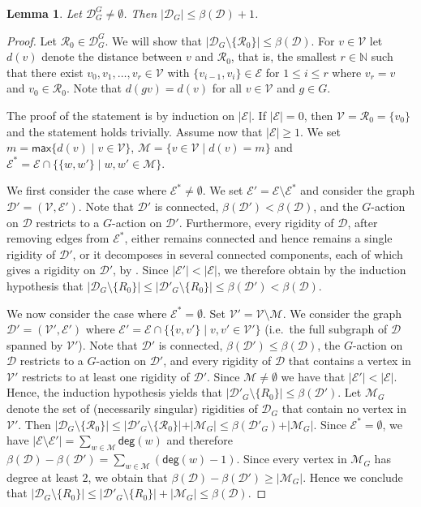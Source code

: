 \documentclass[a4paper,12pt,reqno]{amsart}
\newcommand\nat{\mathbb N}
\newcommand\mc\mathcal
\newtheorem{lem}[thm]{Lemma}
\theoremstyle{definition}
\numberwithin{equation}{thm}
\renewcommand{\max}{\mathsf{max}}
\renewcommand{\leq}{\leqslant}
\renewcommand{\geq}{\geqslant}
\renewcommand{\deg}{\mathsf{deg}}
\begin{document}
\begin{lem}\label{L:G-fixpoint-pivot-count}
Let $\mc{D}^G_G\neq \emptyset$.
Then $|\mc{D}_G | \leq \beta(\mc{D}) + 1$.  
\end{lem}

\begin{proof}
Let  $\mc{R}_0 \in \mc{D}^G_G$. We will show that  $|\mc{D}_G \setminus \{\mc{R}_0\} | \leq \beta(\mc{D})$.
For $v\in\mc{V}$ let $d(v)$ denote the distance between $v$ and $\mc{R}_0$, that is,
the smallest $r\in\nat$ such that there exist $v_0,v_1,\ldots,v_r\in\mc{V}$ with $\{v_{i-1},v_i\}\in\mc{E}$ for $1\leq i\leq r$ where $v_r=v$ and $v_0 \in \mc{R}_0$.
Note that $d(gv)=d(v)$ for all $v\in\mc{V}$ and $g\in G$.

The proof of the statement is  by induction 
 on $|\mc{E}|$.
If $|\mc{E}|=0$, then $\mc{V}= \mc{R}_0=\{v_0\}$ and the statement holds trivially.
Assume now that $|\mc{E}|\geq 1$. We set $m=\max\{d(v)\mid v\in\mc{V}\}$, $\mc{M}=\{v\in\mc{V}\mid d(v)=m\}$ and $\mc{E}^\ast=\mc{E}\cap\{\{w,w'\}\mid w,w'\in\mc{M}\}$.

We first consider the case where $\mc{E}^\ast\neq \emptyset$.
We set $\mc{E}'=\mc{E}\setminus\mc{E}^\ast$ and consider the graph $\mc{D}'=(\mc{V},\mc{E}')$.
Note that $\mc{D}'$ is connected, $\beta(\mc{D}') <\beta(\mc{D})$, and the $G$-action on $\mc{D}$ restricts to a $G$-action on $\mc{D}'$.
Furthermore, every rigidity of $\mc{D}$, after removing edges from $\mc{E}^\ast$, either remains connected and hence remains a single rigidity of $\mc{D}'$, or it decomposes in several connected components, each of which gives a rigidity on $\mc{D}'$, by .
Since $|\mc{E}'|<|\mc{E}|$, we therefore obtain by the induction hypothesis that 
$|\mc{D}_G\setminus\{R_0\}|\leq |\mc{D}'_G\setminus\{R_0\}|\leq \beta(\mc{D}')< \beta(\mc{D})$.

We now consider the case where $\mc{E}^\ast=\emptyset$. 
Set $\mc{V}'=\mc{V}\setminus \mc{M}$. We consider the graph $\mc{D}'=(\mc{V}',\mc{E}')$ where $\mc{E}'=\mc{E}\cap\{\{v,v'\}\mid v,v'\in\mc{V}'\}$ (i.e.~the full subgraph of $\mc{D}$ spanned by $\mc{V}'$).
Note that $\mc{D}'$ is connected,  $\beta(\mc{D}')\leq \beta(\mc{D})$, the $G$-action on $\mc{D}$ restricts to a $G$-action on $\mc{D}'$, and every rigidity of $\mc{D}$ that contains a vertex in $\mc{V}'$ restricts to at least one rigidity of $\mc{D}'$. 
Since $\mc{M}\neq \emptyset$ we have that $|\mc{E}'|<|\mc{E}|$.
Hence, the induction hypothesis yields that  $|\mc{D}'_G\setminus\{R_0\}|\leq \beta(\mc{D}')$. Let $\mc{M}_G$ denote the set of (necessarily singular) rigidities of $\mc{D}_G$ that contain no vertex in $\mc{V}'$.  Then 
$\vert \mc{D}_G\setminus\{\mc{R}_0\} \vert \leq \vert \mc{D}'_G\setminus\{\mc{R}_0\} \vert + \vert \mc{M}_G \vert \leq \beta(\mc{D}'_G) + \vert \mc{M}_G  \vert$.
Since $\mc{E}^\ast=\emptyset$, we have $|\mc{E}\setminus\mc{E}'| = \sum_{w \in \mc{M}} \deg(w)$ and therefore
$\beta(\mc{D})-\beta(\mc{D}')=\sum_{w\in\mc{M}}(\deg(w)-1)$.
Since every vertex in $\mc{M}_G$ has degree at least $2$, we obtain that 
 $\beta(\mc{D})-\beta(\mc{D}')\geq |\mc{M}_G|$.
Hence we conclude that 
 $|\mc{D}_G\setminus\{R_0\}|\leq |\mc{D}'_G \setminus\{R_0\}|+|\mc{M}_G|\leq \beta(\mc{D})$.
\end{proof}
\end{document}
